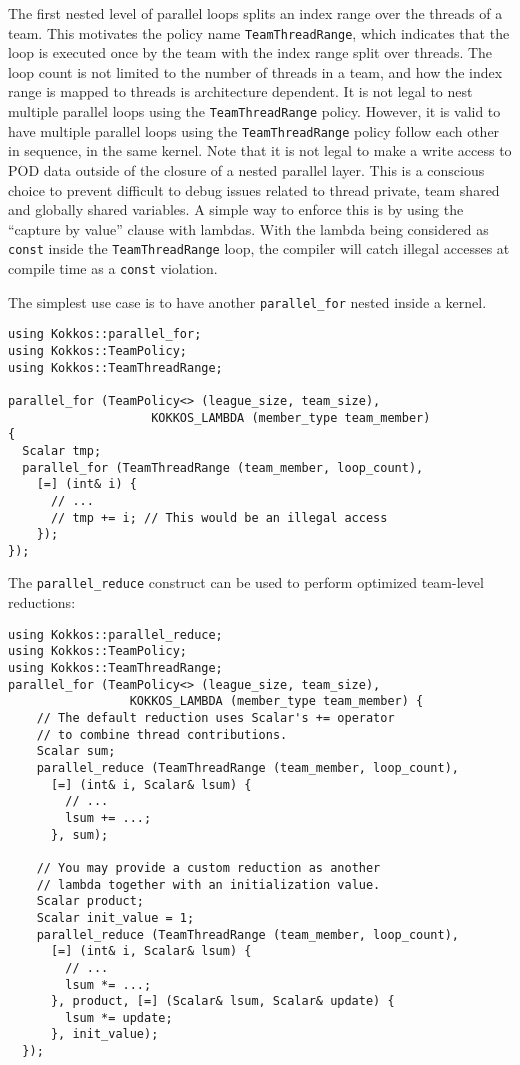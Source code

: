 The first nested level of parallel loops splits an index range over the threads of a team. 
This motivates the policy name \lstinline|TeamThreadRange|, 
which indicates that the loop is executed once by the team with the index range split over threads.
The loop count is not limited to the number of threads in a team, and how the index range is mapped to threads is architecture dependent.
It is not legal to nest multiple parallel loops using the \lstinline!TeamThreadRange! policy.
However, it is valid to have multiple parallel loops using the \lstinline!TeamThreadRange! policy follow each other in sequence, in the same kernel.  
Note that it is not legal to make a write access to POD data outside of the closure of a nested parallel layer. 
This is a conscious choice to prevent difficult to debug issues related to thread private, team shared and globally shared variables. 
A simple way to enforce this is by using the ``capture by value'' clause with lambdas. 
With the lambda being considered as \lstinline|const| inside the \lstinline!TeamThreadRange! loop,
the compiler will catch illegal accesses at compile time as a \lstinline|const| violation.  

The simplest use case is to have another \lstinline|parallel_for| nested inside a kernel. 
\begin{lstlisting}
using Kokkos::parallel_for;
using Kokkos::TeamPolicy;
using Kokkos::TeamThreadRange;

parallel_for (TeamPolicy<> (league_size, team_size), 
                    KOKKOS_LAMBDA (member_type team_member)
{
  Scalar tmp;
  parallel_for (TeamThreadRange (team_member, loop_count), 
    [=] (int& i) {
      // ...
      // tmp += i; // This would be an illegal access
    });
});
\end{lstlisting}

The \lstinline|parallel_reduce| construct can be used to perform optimized team-level reductions:

\begin{lstlisting}
using Kokkos::parallel_reduce;
using Kokkos::TeamPolicy;
using Kokkos::TeamThreadRange;
parallel_for (TeamPolicy<> (league_size, team_size),
                 KOKKOS_LAMBDA (member_type team_member) {
    // The default reduction uses Scalar's += operator
    // to combine thread contributions.
    Scalar sum;
    parallel_reduce (TeamThreadRange (team_member, loop_count), 
      [=] (int& i, Scalar& lsum) {
        // ... 
        lsum += ...;
      }, sum);

    // You may provide a custom reduction as another
    // lambda together with an initialization value.
    Scalar product;
    Scalar init_value = 1;
    parallel_reduce (TeamThreadRange (team_member, loop_count), 
      [=] (int& i, Scalar& lsum) {
        // ...
        lsum *= ...;
      }, product, [=] (Scalar& lsum, Scalar& update) {
        lsum *= update; 
      }, init_value);
  });
\end{lstlisting}

